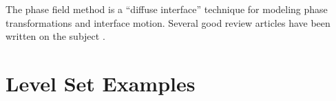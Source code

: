 \documentclass[letterpaper,twoside,openright,10pt]{memoir}
\begin{document}

The phase field method is a ``diffuse interface'' technique for
modeling phase transformations and interface motion. Several good
review articles have been written on the subject
\cite{BoettingerReview:2002,ChenReview:2002,McFaddenReview:2002}.






\label{sec:anisotropy}

% 

\label{sec:impingement}
% 
% 
% 
% 


% 

% 
% 
% 
% 

% 
% 


\chapter{Level Set Examples}
\end{document}
